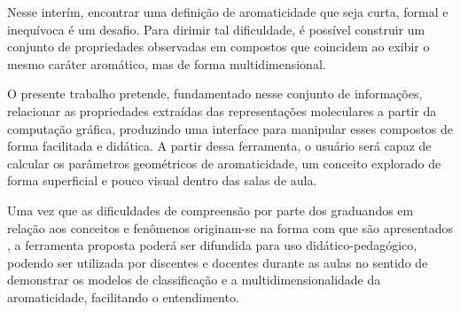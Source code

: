 Nesse interím, encontrar uma definição de aromaticidade que seja curta, formal e inequívoca é um desafio. Para dirimir tal dificuldade, é possível construir um conjunto de propriedades observadas em compostos que coincidem ao exibir o mesmo caráter aromático, mas de forma multidimensional. 




O presente trabalho pretende, fundamentado nesse conjunto de informações, relacionar as propriedades extraídas das representações moleculares a partir da computação gráfica, produzindo uma interface para manipular esses compostos de forma facilitada e didática. A partir dessa ferramenta, o usuário será capaz de calcular os parâmetros geométricos de aromaticidade, um conceito explorado de forma superficial e pouco visual dentro das salas de aula. 

Uma vez que as dificuldades de compreensão por parte dos graduandos em relação aos conceitos e fenômenos originam-se na forma com que são apresentados \autocite{Cunha2018}, a ferramenta proposta poderá ser difundida para uso didático-pedagógico, podendo ser utilizada por discentes e docentes durante as aulas no sentido de demonstrar os modelos de classificação e a multidimensionalidade da aromaticidade, facilitando o entendimento.


